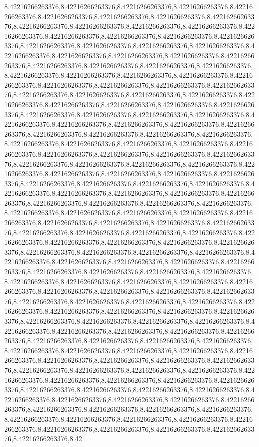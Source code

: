 8.42216266263376,8.42216266263376,8.42216266263376,8.42216266263376,8.42216266263376,8.42216266263376,8.42216266263376,8.42216266263376,8.42216266263376,8.42216266263376,8.42216266263376,8.42216266263376,8.42216266263376,8.42216266263376,8.42216266263376,8.42216266263376,8.42216266263376,8.42216266263376,8.42216266263376,8.42216266263376,8.42216266263376,8.42216266263376,8.42216266263376,8.42216266263376,8.42216266263376,8.42216266263376,8.42216266263376,8.42216266263376,8.42216266263376,8.42216266263376,8.42216266263376,8.42216266263376,8.42216266263376,8.42216266263376,8.42216266263376,8.42216266263376,8.42216266263376,8.42216266263376,8.42216266263376,8.42216266263376,8.42216266263376,8.42216266263376,8.42216266263376,8.42216266263376,8.42216266263376,8.42216266263376,8.42216266263376,8.42216266263376,8.42216266263376,8.42216266263376,8.42216266263376,8.42216266263376,8.42216266263376,8.42216266263376,8.42216266263376,8.42216266263376,8.42216266263376,8.42216266263376,8.42216266263376,8.42216266263376,8.42216266263376,8.42216266263376,8.42216266263376,8.42216266263376,8.42216266263376,8.42216266263376,8.42216266263376,8.42216266263376,8.42216266263376,8.42216266263376,8.42216266263376,8.42216266263376,8.42216266263376,8.42216266263376,8.42216266263376,8.42216266263376,8.42216266263376,8.42216266263376,8.42216266263376,8.42216266263376,8.42216266263376,8.42216266263376,8.42216266263376,8.42216266263376,8.42216266263376,8.42216266263376,8.42216266263376,8.42216266263376,8.42216266263376,8.42216266263376,8.42216266263376,8.42216266263376,8.42216266263376,8.42216266263376,8.42216266263376,8.42216266263376,8.42216266263376,8.42216266263376,8.42216266263376,8.42216266263376,8.42216266263376,8.42216266263376,8.42216266263376,8.42216266263376,8.42216266263376,8.42216266263376,8.42216266263376,8.42216266263376,8.42216266263376,8.42216266263376,8.42216266263376,8.42216266263376,8.42216266263376,8.42216266263376,8.42216266263376,8.42216266263376,8.42216266263376,8.42216266263376,8.42216266263376,8.42216266263376,8.42216266263376,8.42216266263376,8.42216266263376,8.42216266263376,8.42216266263376,8.42216266263376,8.42216266263376,8.42216266263376,8.42216266263376,8.42216266263376,8.42216266263376,8.42216266263376,8.42216266263376,8.42216266263376,8.42216266263376,8.42216266263376,8.42216266263376,8.42216266263376,8.42216266263376,8.42216266263376,8.42216266263376,8.42216266263376,8.42216266263376,8.42216266263376,8.42216266263376,8.42216266263376,8.42216266263376,8.42216266263376,8.42216266263376,8.42216266263376,8.42216266263376,8.42216266263376,8.42216266263376,8.42216266263376,8.42216266263376,8.42216266263376,8.42216266263376,8.42216266263376,8.42216266263376,8.42216266263376,8.42216266263376,8.42216266263376,8.42216266263376,8.42216266263376,8.42216266263376,8.42216266263376,8.42216266263376,8.42216266263376,8.42216266263376,8.42216266263376,8.42216266263376,8.42216266263376,8.42216266263376,8.42216266263376,8.42216266263376,8.42216266263376,8.42216266263376,8.42216266263376,8.42216266263376,8.42216266263376,8.42216266263376,8.42216266263376,8.42216266263376,8.42216266263376,8.42216266263376,8.42216266263376,8.42216266263376,8.42216266263376,8.42216266263376,8.42216266263376,8.42216266263376,8.42216266263376,8.42216266263376,8.42216266263376,8.42216266263376,8.42216266263376,8.42